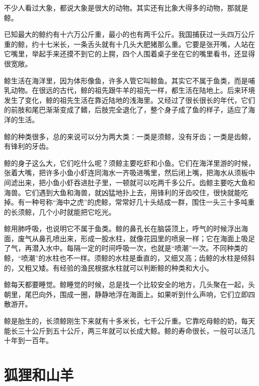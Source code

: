 \documentclass[12pt,UTF-8,openany]{ctexbook}
\begin{document}
\begin{large}
    
    不少人看过大象，都说大象是很大的动物。其实还有比象大得多的动物，那就是鲸。
    
    已知最大的鲸约有十六万公斤重，最小的也有两千公斤。我国捕获过一头四万公斤重的鲸，约十七米长，一条舌头就有十几头大肥猪那么重。它要是张开嘴，人站在它嘴里，举起手来还摸不到它的上腭，四个人围着桌子坐在它的嘴里看书，还显得很宽敞。
    
    鲸生活在海洋里，因为体形像鱼，许多人管它叫鲸鱼。其实它不属于鱼类，而是哺乳动物。在很远的古代，鲸的祖先跟牛羊的祖先一样，都生活在陆地上。后来环境发生了变化，鲸的祖先生活在靠近陆地的浅海里。又经过了很长很长的年代，它们的前肢和尾巴渐渐变成了鳍，后肢完全退化了，整个身子成了鱼的样子，适应了海洋的生活。
    
    鲸的种类很多，总的来说可以分为两大类：一类是须鲸，没有牙齿；一类是齿鲸，有锋利的牙齿。
    
    鲸的身子这么大，它们吃什么呢？须鲸主要吃虾和小鱼。它们在海洋里游的时候，张着大嘴，把许多小鱼小虾连同海水一齐吸进嘴里，然后闭上嘴，把海水从须板中间滤出来，把小鱼小虾吞进肚子里，一顿就可以吃两千多公斤。齿鲸主要吃大鱼和海兽。它们遇到大鱼和海兽，就凶猛地扑上去，用锋利的牙齿咬住，很快就能吃掉。有一种号称“海中之虎”的虎鲸，常常好几十头结成一群，围住一头三十多吨重的长须鲸，几个小时就能把它吃光。
    
    鲸用肺呼吸，也说明它不属于鱼类。鲸的鼻孔长在脑袋顶上，呼气的时候浮出海面，废气从鼻孔喷出来，形成一股水柱，就像花园里的喷泉一样；它在海面上吸足了气，再潜入水中。每隔一定的时间呼吸一次，也就是“喷潮”一次。不同种类的鲸，“喷潮”的水柱也不一样。须鲸的水柱是垂直的，又细又高；齿鲸的水柱是倾斜的，又粗又矮。有经验的渔民根据水柱就可以判断鲸的种类和大小。
    
    鲸每天都要睡觉。鲸睡觉的时候，总是找一个比较安全的地方，几头聚在一起，头朝里，尾巴向外，围成一圈，静静地浮在海面上。如果听到什么声响，它们立即四散游开。
    
    鲸是胎生的，长须鲸刚生下来就有十多米长，七千公斤重。它靠吃母鲸的奶，每天能长三十公斤到五十公斤，两三年就可以长成大鲸。鲸的寿命很长，一般可以活几十年到一百年。
    
\end{large}



\chapter{狐狸和山羊}
\end{document}
